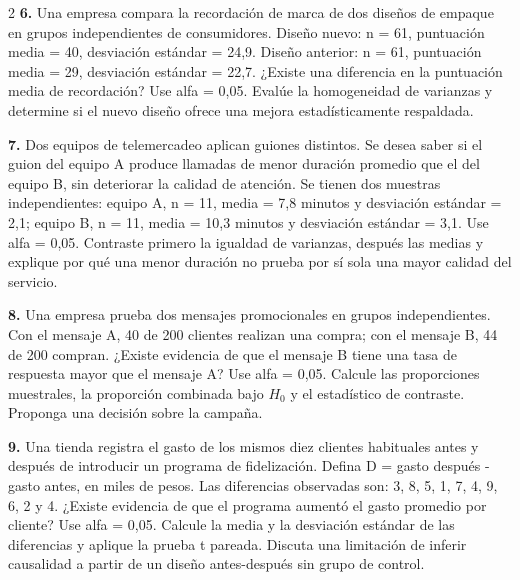 \documentclass[14pt,letterpaper]{article}
\begin{document}
\begin{multicols}{2}
\noindent\textbf{6.} Una empresa compara la recordación de marca de dos diseños de empaque en grupos independientes de consumidores. Diseño nuevo: n = 61, puntuación media = 40, desviación estándar = 24,9. Diseño anterior: n = 61, puntuación media = 29, desviación estándar = 22,7. ¿Existe una diferencia en la puntuación media de recordación? Use alfa = 0,05. Evalúe la homogeneidad de varianzas y determine si el nuevo diseño ofrece una mejora estadísticamente respaldada.\par\vspace{7pt}
\noindent\textbf{7.} Dos equipos de telemercadeo aplican guiones distintos. Se desea saber si el guion del equipo A produce llamadas de menor duración promedio que el del equipo B, sin deteriorar la calidad de atención. Se tienen dos muestras independientes: equipo A, n = 11, media = 7,8 minutos y desviación estándar = 2,1; equipo B, n = 11, media = 10,3 minutos y desviación estándar = 3,1. Use alfa = 0,05. Contraste primero la igualdad de varianzas, después las medias y explique por qué una menor duración no prueba por sí sola una mayor calidad del servicio.\par\vspace{20pt}
\noindent\textbf{8.} Una empresa prueba dos mensajes promocionales en grupos independientes. Con el mensaje A, 40 de 200 clientes realizan una compra; con el mensaje B, 44 de 200 compran. ¿Existe evidencia de que el mensaje B tiene una tasa de respuesta mayor que el mensaje A? Use alfa = 0,05. Calcule las proporciones muestrales, la proporción combinada bajo \(H_0\) y el estadístico de contraste. Proponga una decisión sobre la campaña.\par\vspace{20pt}
\noindent\textbf{9.} Una tienda registra el gasto de los mismos diez clientes habituales antes y después de introducir un programa de fidelización. Defina D = gasto después - gasto antes, en miles de pesos. Las diferencias observadas son: 3, 8, 5, 1, 7, 4, 9, 6, 2 y 4. ¿Existe evidencia de que el programa aumentó el gasto promedio por cliente? Use alfa = 0,05. Calcule la media y la desviación estándar de las diferencias y aplique la prueba t pareada. Discuta una limitación de inferir causalidad a partir de un diseño antes-después sin grupo de control.\par\vspace{20pt}
\end{multicols}
\end{document}
